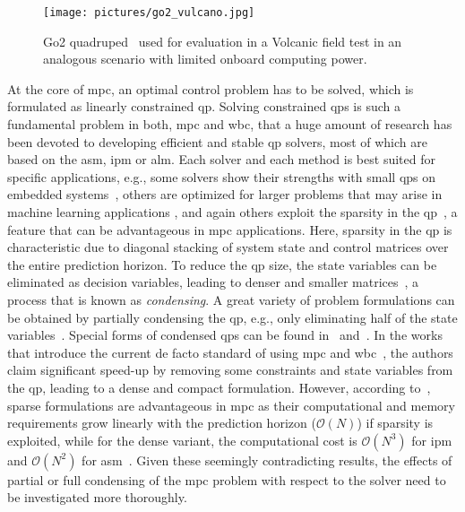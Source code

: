 \begin{figure}[t]
    \centering
    \texttt{[image: pictures/go2\_vulcano.jpg]}
    \caption{Go2 quadruped~\cite{unitree_robotics_unitree_nodate} used for evaluation in a Volcanic field test in an analogous scenario with limited onboard computing power.}
    \label{fig:go2_quad}
    \vspace{-0.5cm}
\end{figure}

At the core of \gls{mpc}, an optimal control problem has to be solved, which is formulated as linearly constrained \gls{qp}. 
Solving constrained \gls{qp}s is such a fundamental problem in both, \gls{mpc} and \gls{wbc}, that a huge amount of research has been devoted to developing efficient and stable \gls{qp} solvers, most of which are based on the \gls{asm}, \gls{ipm} or \gls{alm}. 
Each solver and each method is best suited for specific applications, e.g., some solvers show their strengths with small \gls{qp}s on embedded systems~\cite{ferreau_qpoases_2014}, others are optimized for larger problems that may arise in machine learning applications \cite{stellato_osqp_2020, boyd_distributed_2011}, and again others exploit the sparsity in the \gls{qp}~\cite{frison_hpipm_2020, stellato_osqp_2020}, a feature that can be advantageous in \gls{mpc} applications. 
Here, sparsity in the \gls{qp} is characteristic due to diagonal stacking of system state and control matrices over the entire prediction horizon. 
To reduce the \gls{qp} size, the state variables can be eliminated as decision variables, leading to denser and smaller matrices~\cite{jerez_sparse_2012}, a process that is known as \textit{condensing}. 
A great variety of problem formulations can be obtained by partially condensing the \gls{qp}, e.g., only eliminating half of the state variables~\cite{axehill_controlling_2015}. Special forms of condensed \gls{qp}s can be found in~\cite{jerez_sparse_2012} and~\cite{di_carlo_dynamic_2018}. 
In the works that introduce the current de facto standard of using \gls{mpc} and  
\gls{wbc}~\cite{di_carlo_dynamic_2018, kim_highly_2019}, the authors claim significant speed-up by removing some constraints and state variables from the \gls{qp}, leading to a dense and compact formulation. However, according to~\cite{axehill_controlling_2015}, sparse formulations are advantageous in \gls{mpc} as their computational and memory requirements grow linearly with the prediction horizon ($ \mathcal{O}(N) $) if sparsity is exploited, while for the dense variant, the computational cost is $\mathcal{O}(N^3)$ for \gls{ipm} and $\mathcal{O}(N^2)$ for \gls{asm}~\cite{dimitrov_sparse_2011}. Given these seemingly contradicting results, the effects of partial or full condensing of the \gls{mpc} problem with respect to the solver need to be investigated more thoroughly. 

